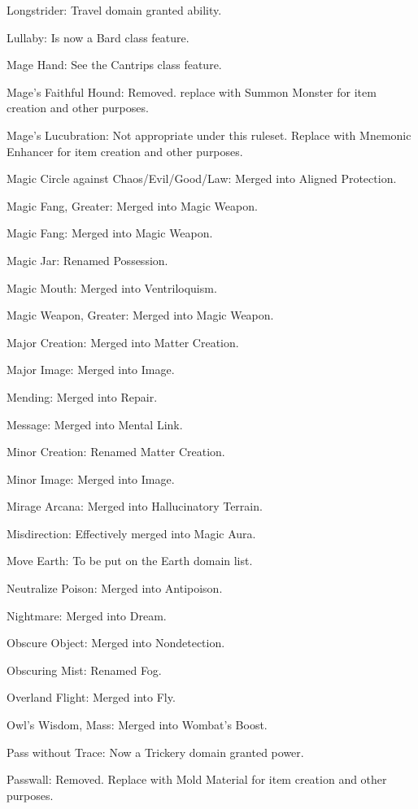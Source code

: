 {\begin{list}{}{\leftmargin=1em}
 \item Longstrider: Travel domain granted ability.
 \item Lullaby: Is now a Bard class feature.
 \item Mage Hand: See the Cantrips class feature.
 \item Mage's Faithful Hound: Removed. replace with Summon Monster for item creation and other purposes.
 \item Mage's Lucubration: Not appropriate under this ruleset. Replace with Mnemonic Enhancer for item creation and other purposes.
 \item Magic Circle against Chaos/Evil/Good/Law: Merged into Aligned Protection.
 \item Magic Fang, Greater: Merged into Magic Weapon.
 \item Magic Fang: Merged into Magic Weapon.
 \item Magic Jar: Renamed Possession.
 \item Magic Mouth: Merged into Ventriloquism.
 \item Magic Weapon, Greater: Merged into Magic Weapon.
 \item Major Creation: Merged into Matter Creation.
 \item Major Image: Merged into Image.
 \item Mending: Merged into Repair.
 \item Message: Merged into Mental Link.
 \item Minor Creation: Renamed Matter Creation.
 \item Minor Image: Merged into Image.
 \item Mirage Arcana: Merged into Hallucinatory Terrain.
 \item Misdirection: Effectively merged into Magic Aura.
 \item Move Earth: To be put on the Earth domain list.
 \item Neutralize Poison: Merged into Antipoison.
 \item Nightmare: Merged into Dream.
 \item Obscure Object: Merged into Nondetection.
 \item Obscuring Mist: Renamed Fog.
 \item Overland Flight: Merged into Fly.
 \item Owl's Wisdom, Mass: Merged into Wombat's Boost.
 \item Pass without Trace: Now a Trickery domain granted power.
 \item Passwall: Removed. Replace with Mold Material for item creation and other purposes.

\end{list}}
